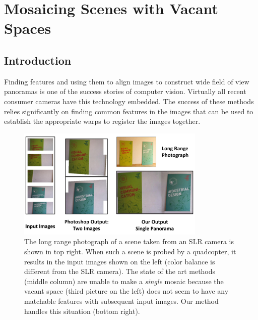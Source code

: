 \chapter{Mosaicing Scenes with  Vacant Spaces}
\label{ch:vacantSpaces}
\section{Introduction}
Finding features and using them to align images to construct wide
field of view panoramas is one of the success stories of computer
vision.  Virtually all recent consumer cameras have this technology
embedded.  The success of these methods relies significantly on
finding common features in the images that can be used to establish
the appropriate warps to register the images together.

\begin{figure}
  \centering
  \includegraphics[width=0.8\textwidth]{figures/vacantSpaces/teaser.pdf}
  \caption[Overview]{ \label{fig:vacantTeaser} The long range photograph of a scene
    taken from an SLR camera is shown in top right.  When such a scene
    is probed by a quadcopter, it results in the input images shown on
    the left (color balance is different from the SLR camera).  The
    state of the art methods (middle column) are unable to make a
    \emph{single} mosaic because the vacant space (third picture on
    the left) does not seem to have any matchable features with
    subsequent input images. Our method handles this situation (bottom
    right).  }
\end{figure}

